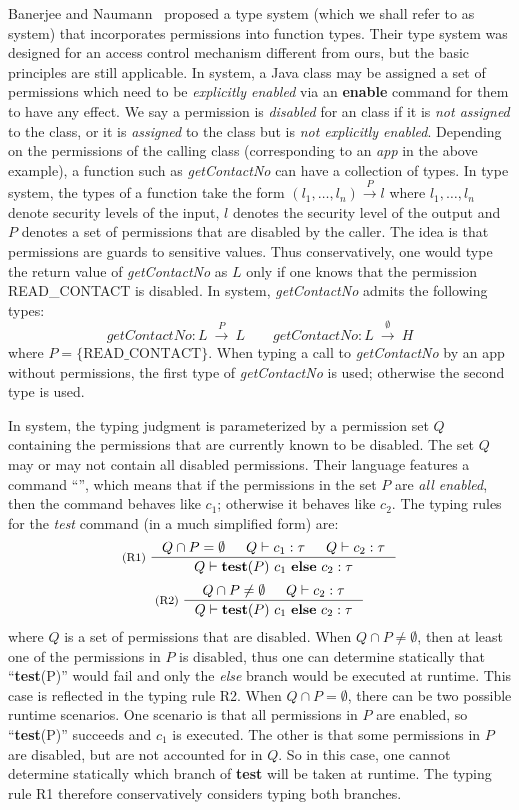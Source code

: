 Banerjee and Naumann~\cite{Banerjee:2005ht} proposed a type system (which we shall refer to as {\BN} system)
that incorporates permissions into function types.
Their type system was designed for an access control mechanism different from ours,
but the basic principles are still applicable.
In {\BN} system, a Java class may be assigned a set of permissions which need to be {\em explicitly enabled} via an \textbf{enable} command for them to have any effect.
We say a permission is {\em disabled} for an class if it is \emph{not assigned} to the class, or it is \emph{assigned} to the class but is \emph{not explicitly enabled}.
Depending on the permissions of
the calling class (corresponding to an \emph{app} in the above example), a function such as \textit{getContactNo} can have a collection of types. In {\BN} type system, the types of a function take
the form $(l_1,\dots, l_n)\xrightarrow{~P~}l$
where $l_1,\dots,l_n$ denote security levels of the input, $l$ denotes the security level of the output
and $P$ denotes a set of permissions that are disabled by the caller.
The idea is that permissions are guards to sensitive values. Thus conservatively, one would type the return value of \textit{getContactNo} as $L$ only if
one knows that the permission READ\_CONTACT is disabled.
In {\BN} system, \textit{getContactNo} admits the following types:
\begin{equation*}
\textit{getContactNo} : L~\xrightarrow{~P~}~L\qquad
\textit{getContactNo} : L~\xrightarrow{~\emptyset~}~H
\end{equation*}
where $P = \{ \mathrm{READ\_CONTACT} \}.$
When typing a call to \textit{getContactNo} by
an app without permissions,
the first type of \textit{getContactNo} is used; otherwise
the second type is used.

In {\BN} system, the typing judgment is parameterized
by a permission set $Q$ containing the permissions that are
currently known to be disabled. The set $Q$ may or may not contain all disabled permissions.
Their language features a command ``'', which
means that if the permissions in the set $P$ are \emph{all enabled}, then
the command behaves like $c_1$; otherwise it behaves like $c_2$.
The typing rules for the \textit{test} command (in a much
simplified form) are:
\[
\inference[(R1)~]{
Q \cap P = \emptyset & Q |- c_1 : \tau & Q \vdash {c_2} : \tau
}
{
Q \vdash \lcCP{P}{c_1}{c_2} : \tau
}
\]
\[
\inference[(R2)~]{
Q \cap P \not = \emptyset & Q \vdash c_2 : \tau
}
{
Q \vdash \lcCP{P}{c_1}{c_2} : \tau
}
\]
where $Q$ is a set of permissions that are disabled.
When $Q \cap P \not = \emptyset$, then
at least one of the permissions in $P$ is disabled, thus
one can determine statically that ``\textbf{test}(P)'' would fail and only the \emph{else} branch would be executed at runtime. This case is
reflected in the typing rule R2.
When $Q \cap P = \emptyset$, there can be two possible runtime scenarios.
One scenario is that all permissions in $P$ are enabled, so ``\textbf{test}(P)'' succeeds and $c_1$ is executed.
The other is that some permissions in $P$ are disabled, but are not accounted for in $Q$.
So in this case, one cannot determine statically which branch of \textbf{test} will be
taken at runtime. The typing rule R1 therefore conservatively considers typing both branches.

